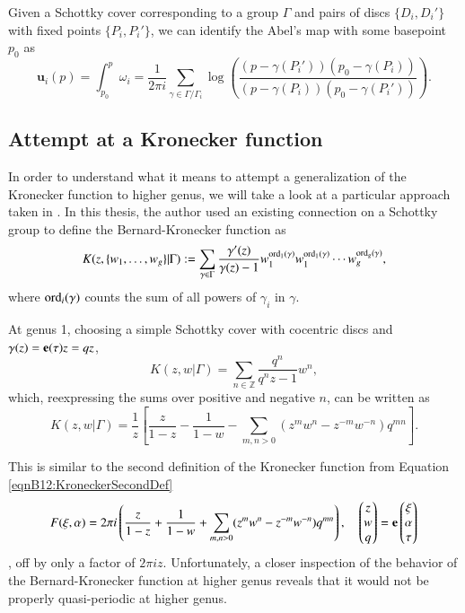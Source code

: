 \begin{definition}
    Given a Schottky cover corresponding to a group $\Gamma$ and pairs of discs $\{D_i,D_i'\}$ with fixed points $\{P_i,P_i'\}$, we can identify the Abel's map with some basepoint $p_0$ as
    \begin{equation}
        \mathbf{u}_i(p) = \int_{p_0}^p \omega_i = \frac{1}{2\pi i } \sum_{\gamma \in \Gamma/\Gamma_i} \log\left(\frac{(p-\gamma(P_i'))(p_0-\gamma(P_i))}{(p-\gamma(P_i))(p_0-\gamma(P_i'))}\right).
    \end{equation}
\end{definition}

\subsection{Attempt at a Kronecker function}

In order to understand what it means to attempt a generalization of the Kronecker function to higher genus,
we will take a look at a particular approach taken in \cite{Cha22}.
In this thesis, the author used an existing connection on a Schottky group to define the Bernard-Kronecker function as
\begin{equation}
    K(z,\{w_1,\ldots,w_g\}|\Gamma) := \sum_{\gamma \in \Gamma} \frac{\gamma'(z)}{\gamma(z)-1} w_1^{\operatorname{ord}_1(\gamma)} w_1^{\operatorname{ord}_1(\gamma)} \cdots w_g^{\operatorname{ord}_g(\gamma)},
\end{equation}
where $\operatorname{ord}_i(\gamma)$ counts the sum of all powers of $\gamma_i$ in $\gamma$.

At genus 1, choosing a simple Schottky cover with cocentric discs and $\gamma(z) = \mathbf{e}(\tau) z = qz$,
\begin{equation}
    K(z,w|\Gamma) = \sum_{n \in \mathbb Z} \frac{q^n}{q^n z - 1} w^{n},
\end{equation}
which, reexpressing the sums over positive and negative $n$, can be written as
\begin{equation}
    K(z,w|\Gamma) = \frac{1}{z}\left[ \frac{z}{1-z} - \frac{1}{1-w} - \sum_{m,n > 0} (z^m w^n - z^{-m} w^{-n}) q^{mn} \right].
\end{equation}

This is similar to the second definition of the Kronecker function from Equation \ref{eqnB12:KroneckerSecondDef}
\begin{equation} F(\xi,\alpha) = 2\pi i \left(\frac{z}{1-z} + \frac{1}{1-w} + \sum_{m,n > 0} (z^m w^n - z^{-m} w^{-n}) q^{mn}\right) , \quad \begin{pmatrix} z \\ w \\ q \end{pmatrix} = \mathbf{e} \begin{pmatrix}\xi \\ \alpha \\ \tau\end{pmatrix} \end{equation},
off by only a factor of $2 \pi i z$. Unfortunately, a closer inspection of the behavior of the Bernard-Kronecker function at higher genus reveals that it would not be properly quasi-periodic at higher genus.

